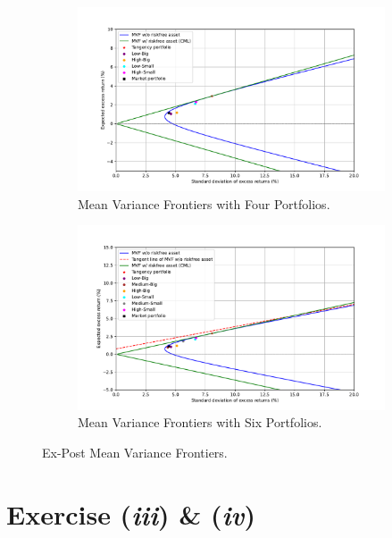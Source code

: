 \documentclass[a4paper,10pt,american]{article}
\begin{document}
\begin{figure}[H]
    \centering
    \begin{subfigure}[b]{0.48\textwidth}
        \centering
        \includegraphics[width=\linewidth]{../Plots/ex_post_MVF.pdf}
        \caption{Mean Variance Frontiers with Four Portfolios.}
        \label{fig:MVF4}
    \end{subfigure}
    \hfill
    \begin{subfigure}[b]{0.48\textwidth}
        \centering
        \includegraphics[width=\linewidth]{../Plots/ex_post_MVF_v2.pdf}
        \caption{Mean Variance Frontiers with Six Portfolios.}
        \label{fig:MVF6}
    \end{subfigure}
    \caption{Ex-Post Mean Variance Frontiers.}
    \label{fig:MVF}
\end{figure}

\section*{Exercise (\textit{iii}) \& (\textit{iv})}
\end{document}
